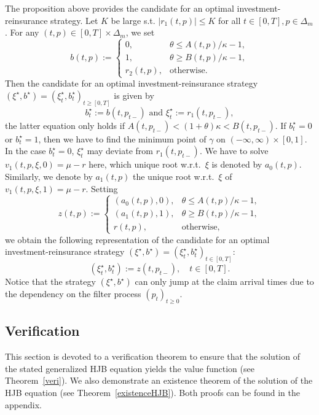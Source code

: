 \documentclass[reqno, 11pt]{amsart}%
\theoremstyle{definition}
\numberwithin{equation}{section} \numberwithin{theorem}{section}
\begin{document}
The proposition above provides the candidate for an optimal investment-reinsurance strategy. Let $K$ be large s.t. $|r_1(t,p)|\le K$ for all $t\in [0,T], p\in \Delta_m$.
For any $(t,p)\in[0,T]\times\Delta_m$, we set
\begin{equation*}
b(t,p) := \begin{cases} 0, & \theta\le A(t,p)/\kappa-1,\\
1, &\theta\ge B(t,p)/\kappa-1, \\
r_2(t,p), &\text{otherwise}.
\end{cases}
\end{equation*}
Then the candidate for an optimal investment-reinsurance strategy $(\xi^\star,b^\star)=(\xi^\star_t,b^\star_t)_{t\ge[0,T]}$ is given by 
\begin{equation*}
  b^\star_t := b(t,p_{t-}) \mbox{ and } \xi^\star_t := r_1(t,p_{t-}),
\end{equation*}
the latter equation only holds if $A(t,p_{t-})<(1+\theta)\kappa < B(t,p_{t-})$. If $b_t^\star=0$ or $b_t^\star=1$, then we have to find the minimum point of $\gamma$ on $(-\infty, \infty)\times [0,1]$. In the case $b_t^\star=0$, $\xi_t^\star$ may deviate from $r_1(t,p_{t-})$.
We have to solve $v_1(t,p,\xi,0)=\mu-r$ here, which unique root w.r.t.\ $\xi$ is denoted by $a_0(t,p)$.
Similarly, we denote by $a_1(t,p)$ the unique root w.r.t.\ $\xi$ of $v_1(t,p,\xi,1)=\mu-r$.
Setting
\begin{equation*}
z(t,p) := \begin{cases} (a_0(t,p),0), & \theta\le A(t,p)/\kappa-1,\\
(a_1(t,p),1), &\theta\ge B(t,p)/\kappa-1, \\
r(t,p), &\text{otherwise},
\end{cases}
\end{equation*}
we obtain the following representation of the candidate for an optimal investment-reinsurance strategy $(\xi^\star,b^\star)=(\xi^\star_t,b^\star_t)_{t\in[0,T]}$:
\begin{equation}\label{optstr}
(\xi^\star_t,b^\star_t) := z(t,p_{t-}),\quad t\in[0,T].
\end{equation}
Notice that the strategy $(\xi^\star,b^\star)$ can only jump at the claim arrival times due to the dependency on the filter process $(p_t)_{t\ge0}$. 

\subsection{Verification}
This section is devoted to a verification theorem to ensure that the solution of the stated generalized HJB equation yields the value function (see Theorem~\ref{veri}). We also demonstrate an existence theorem of the solution of the HJB equation (see Theorem~\ref{existenceHJB}).  Both proofs can be found in the appendix.
\end{document}
